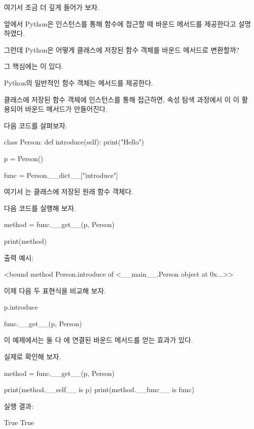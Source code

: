여기서 조금 더 깊게 들어가 보자.

앞에서 Python은 인스턴스를 통해 함수에 접근할 때 바운드 메서드를 제공한다고 설명하였다.

그런데 Python은 어떻게 클래스에 저장된 함수 객체를 바운드 메서드로 변환할까?

그 핵심에는 이 있다.

Python의 일반적인 함수 객체는  메서드를 제공한다.

클래스에 저장된 함수 객체에 인스턴스를 통해 접근하면, 속성 탐색 과정에서 이 이 활용되어 바운드 메서드가 만들어진다.

다음 코드를 살펴보자.

\begin{dhkcode}
class Person:
    def introduce(self):
        print("Hello")

p = Person()

func = Person.__dict__["introduce"]
\end{dhkcode}

여기서 는 클래스에 저장된 원래 함수 객체다.

다음 코드를 실행해 보자.

\begin{dhkcode}
method = func.__get__(p, Person)

print(method)
\end{dhkcode}

출력 예시:

\begin{dhkzsh}
<bound method Person.introduce of <__main__.Person object at 0x...>>
\end{dhkzsh}

이제 다음 두 표현식을 비교해 보자.

\begin{dhkcode}
p.introduce

func.__get__(p, Person)
\end{dhkcode}

이 예제에서는 둘 다 에 연결된 바운드 메서드를 얻는 효과가 있다.

실제로 확인해 보자.

\begin{dhkcode}
method = func.__get__(p, Person)

print(method.__self__ is p)
print(method.__func__ is func)
\end{dhkcode}

실행 결과:

\begin{dhkzsh}
True
True
\end{dhkzsh}

